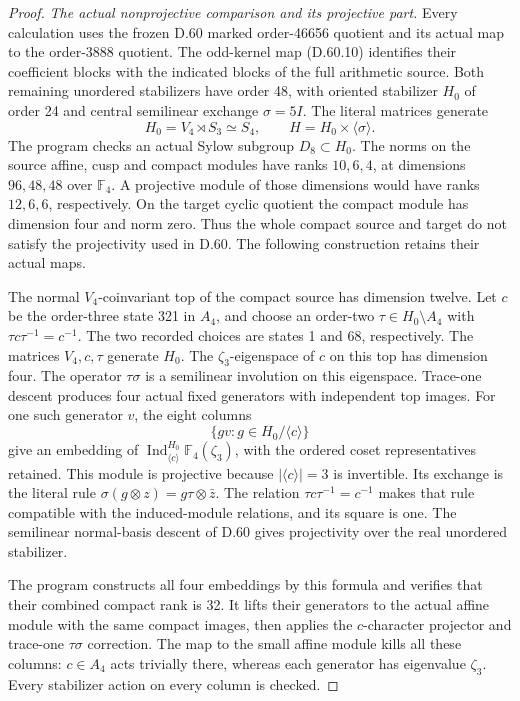 \begin{proof}
\emph{The actual nonprojective comparison and its projective part.}
Every calculation uses the frozen D.60 marked
order-46656 quotient and its actual map to
the order-3888 quotient. The odd-kernel map
(D.60.10) identifies their coefficient blocks
with the indicated blocks of the full
arithmetic source. Both remaining unordered
stabilizers have order 48, with oriented
stabilizer \(H_0\) of order 24 and central
semilinear exchange \(\sigma=5I\).
The literal matrices generate
\[
              H_0=V_4\rtimes S_3\simeq S_4,
              \qquad H=H_0\times\langle\sigma\rangle.
 \tag{D.61.11}
\]
The program 
checks an actual Sylow subgroup \(D_8\subset H_0\).
The norms on the source affine, cusp and
compact modules have ranks \(10,6,4\), at
dimensions \(96,48,48\) over \(\mathbb F_4\).
A projective module of those dimensions
would have ranks \(12,6,6\), respectively.
On the target cyclic quotient the compact
module has dimension four and norm zero.
Thus the whole compact source and target
do not satisfy the projectivity used in
D.60. The following construction retains
their actual maps.

The normal \(V_4\)-coinvariant top of
the compact source has dimension twelve.
Let \(c\) be the order-three state 321
in \(A_4\), and choose an order-two
\(\tau\in H_0\setminus A_4\) with
\(\tau c\tau^{-1}=c^{-1}\).
The two recorded choices are states 1
and 68, respectively. The matrices
\(V_4,c,\tau\) generate \(H_0\).
The \(\zeta_3\)-eigenspace of \(c\)
on this top has dimension four.
The operator \(\tau\sigma\) is a
semilinear involution on this eigenspace.
Trace-one descent produces four actual
fixed generators with independent top
images. For one such generator \(v\),
the eight columns
\[
        \{gv:g\in H_0/\langle c\rangle\}
 \tag{D.61.12}
\]
give an embedding of
\(\operatorname{Ind}_{\langle c\rangle}^{H_0}
\mathbb F_4(\zeta_3)\), with the
ordered coset representatives retained.
This module is projective because
\(|\langle c\rangle|=3\) is invertible.
Its exchange is the literal rule
\(\sigma(g\otimes z)=g\tau\otimes\bar z\).
The relation \(\tau c\tau^{-1}=c^{-1}\)
makes that rule compatible with the
induced-module relations, and its square
is one. The semilinear normal-basis
descent of D.60 gives projectivity
over the real unordered stabilizer.

The program
constructs all four embeddings by this
formula and verifies that their combined
compact rank is 32. It lifts their
generators to the actual affine module
with the same compact images, then
applies the \(c\)-character projector
and trace-one \(\tau\sigma\) correction.
The map to the small affine module
kills all these columns: \(c\in A_4\)
acts trivially there, whereas each
generator has eigenvalue \(\zeta_3\).
Every stabilizer action on every column
is checked.


\end{proof}
